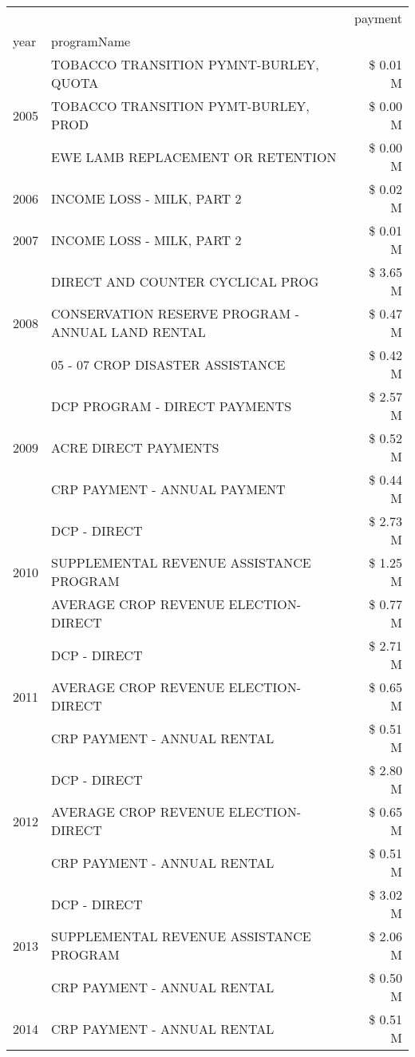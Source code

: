 \begin{tabular}{llr}
\toprule
 &  & payment \\
year & programName &  \\
\midrule
\multirow[t]{3}{*}{2005} & TOBACCO TRANSITION PYMNT-BURLEY, QUOTA & \$ 0.01 M \\
 & TOBACCO TRANSITION PYMT-BURLEY, PROD & \$ 0.00 M \\
 & EWE LAMB REPLACEMENT OR RETENTION & \$ 0.00 M \\
\cline{1-3}
2006 & INCOME LOSS - MILK, PART 2 & \$ 0.02 M \\
\cline{1-3}
2007 & INCOME LOSS - MILK, PART 2 & \$ 0.01 M \\
\cline{1-3}
\multirow[t]{3}{*}{2008} & DIRECT AND COUNTER CYCLICAL PROG & \$ 3.65 M \\
 & CONSERVATION RESERVE PROGRAM - ANNUAL LAND RENTAL & \$ 0.47 M \\
 & 05 - 07 CROP DISASTER ASSISTANCE & \$ 0.42 M \\
\cline{1-3}
\multirow[t]{3}{*}{2009} & DCP PROGRAM - DIRECT PAYMENTS & \$ 2.57 M \\
 & ACRE DIRECT PAYMENTS & \$ 0.52 M \\
 & CRP PAYMENT - ANNUAL PAYMENT & \$ 0.44 M \\
\cline{1-3}
\multirow[t]{3}{*}{2010} & DCP - DIRECT & \$ 2.73 M \\
 & SUPPLEMENTAL REVENUE ASSISTANCE PROGRAM & \$ 1.25 M \\
 & AVERAGE CROP REVENUE ELECTION-DIRECT & \$ 0.77 M \\
\cline{1-3}
\multirow[t]{3}{*}{2011} & DCP - DIRECT & \$ 2.71 M \\
 & AVERAGE CROP REVENUE ELECTION-DIRECT & \$ 0.65 M \\
 & CRP PAYMENT - ANNUAL RENTAL & \$ 0.51 M \\
\cline{1-3}
\multirow[t]{3}{*}{2012} & DCP - DIRECT & \$ 2.80 M \\
 & AVERAGE CROP REVENUE ELECTION-DIRECT & \$ 0.65 M \\
 & CRP PAYMENT - ANNUAL RENTAL & \$ 0.51 M \\
\cline{1-3}
\multirow[t]{3}{*}{2013} & DCP - DIRECT & \$ 3.02 M \\
 & SUPPLEMENTAL REVENUE ASSISTANCE PROGRAM & \$ 2.06 M \\
 & CRP PAYMENT - ANNUAL RENTAL & \$ 0.50 M \\
\cline{1-3}
\multirow[t]{3}{*}{2014} & CRP PAYMENT - ANNUAL RENTAL & \$ 0.51 M \\

\end{tabular}
